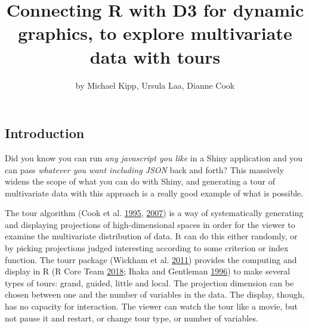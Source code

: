 \title{Connecting R with D3 for dynamic graphics, to explore multivariate data
with tours}
\author{by Michael Kipp, Ursula Laa, Dianne Cook}

\maketitle



\hypertarget{introduction}{%
\subsection{Introduction}\label{introduction}}

Did you know you can run \emph{any javascript you like} in a Shiny
application and you can pass \emph{whatever you want including JSON}
back and forth? This massively widens the scope of what you can do with
Shiny, and generating a tour of multivariate data with this approach is
a really good example of what is possible.

The tour algorithm (Cook et al. \protect\hyperlink{ref-gt_pp}{1995},
\protect\hyperlink{ref-gt_pp_mc}{2007}) is a way of systematically
generating and displaying projections of high-dimensional spaces in
order for the viewer to examine the multivariate distribution of data.
It can do this either randomly, or by picking projections judged
interesting according to some criterion or index function. The tourr
package (Wickham et al. \protect\hyperlink{ref-tourr}{2011}) provides
the computing and display in R (R Core Team
\protect\hyperlink{ref-R}{2018}; Ihaka and Gentleman
\protect\hyperlink{ref-ihaka:1996}{1996}) to make several types of
tours: grand, guided, little and local. The projection dimension can be
chosen between one and the number of variables in the data. The display,
though, has no capacity for interaction. The viewer can watch the tour
like a movie, but not pause it and restart, or change tour type, or
number of variables.

